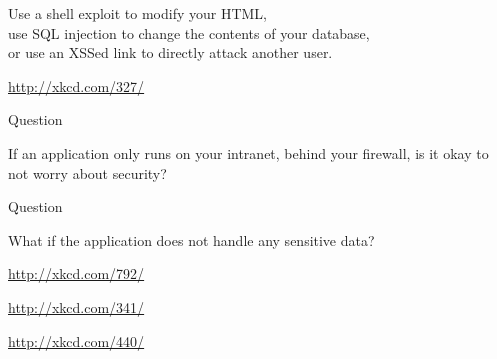 \documentclass{beamer}
\begin{document}
\begin{frame}{}
\begin{center}
Use a shell exploit to modify your HTML, \\ use SQL injection to change the contents of your database, \\ or use an XSSed link to directly attack another user.
\end{center}
\end{frame}

\begin{frame}{}
\parbox[c][0.6\paperheight]{\paperwidth}{ }
\parbox[c][0.2\paperheight]{\paperwidth}{ \tiny{\href{http://xkcd.com/327/}{http://xkcd.com/327/}} }
\end{frame}


\begin{frame}{Question}
\begin{center}
If an application only runs on your intranet, behind your firewall, is it okay to not worry about security?
\end{center}
\end{frame}

\begin{frame}{Question}
\begin{center}
What if the application does not handle any sensitive data?
\end{center}
\end{frame}

\begin{frame}{}
\parbox[c][0.7\paperheight]{\paperwidth}{ }
\parbox[c][0.2\paperheight]{\paperwidth}{ \tiny{\href{http://xkcd.com/792/}{http://xkcd.com/792/}} }
\end{frame}

\begin{frame}{}
\parbox[c][0.6\paperheight]{\paperwidth}{ }
\parbox[c][0.2\paperheight]{\paperwidth}{ \tiny{\href{http://xkcd.com/341/}{http://xkcd.com/341/}} }
\end{frame}

\begin{frame}{}
\parbox[c][0.6\paperheight]{\paperwidth}{ }
\parbox[c][0.2\paperheight]{\paperwidth}{ \tiny{\href{http://xkcd.com/440/}{http://xkcd.com/440/}} }
\end{frame}
\end{document}
